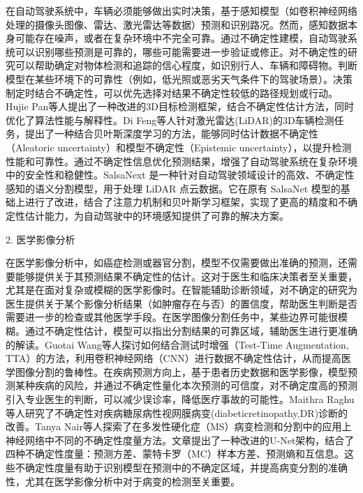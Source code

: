 在自动驾驶系统中，车辆必须能够做出实时决策，基于感知模型（如卷积神经网络处理的摄像头图像、雷达、激光雷达等数据）预测和识别路况。然而，感知数据本身可能存在噪声，或者在复杂环境中不完全可靠。通过不确定性建模，自动驾驶系统可以识别哪些预测是可靠的，哪些可能需要进一步验证或修正。对不确定性的研究可以帮助确定对物体检测和追踪的信心程度，如识别行人、车辆和障碍物。判断模型在某些环境下的可靠性（例如，低光照或恶劣天气条件下的驾驶场景）。决策制定时结合不确定性，可以优先选择对结果不确定性较低的路径规划或行动。Hujie Pan等人\cite{pan2020towards}提出了一种改进的3D目标检测框架，结合不确定性估计方法，同时优化了算法性能与解释性。Di Feng等人\cite{feng2018towards}针对激光雷达(LiDAR)的3D车辆检测任务，提出了一种结合贝叶斯深度学习的方法，能够同时估计数据不确定性（Aleatoric uncertainty）和模型不确定性（Epistemic uncertainty），以提升检测性能和可靠性。通过不确定性信息优化预测结果，增强了自动驾驶系统在复杂环境中的安全性和稳健性。SalsaNext\cite{cortinhal2020salsanext} 是一种针对自动驾驶领域设计的高效、不确定性感知的语义分割模型，用于处理 LiDAR 点云数据。它在原有 SalsaNet 模型的基础上进行了改进，结合了注意力机制和贝叶斯学习框架，实现了更高的精度和不确定性估计能力，为自动驾驶中的环境感知提供了可靠的解决方案。

2. 医学影像分析

在医学影像分析中，如癌症检测或器官分割，模型不仅需要做出准确的预测，还需要能够提供关于其预测结果不确定性的估计。这对于医生和临床决策者至关重要，尤其是在面对复杂或模糊的医学影像时。在智能辅助诊断领域，对不确定的研究为医生提供关于某个影像分析结果（如肿瘤存在与否）的置信度，帮助医生判断是否需要进一步的检查或其他医学手段。在医学图像分割任务中，某些边界可能很模糊。通过不确定性估计，模型可以指出分割结果的可靠区域，辅助医生进行更准确的解读。Guotai Wang等人\cite{wang2019aleatoric}探讨如何结合测试时增强（Test-Time Augmentation, TTA）的方法，利用卷积神经网络（CNN）进行数据不确定性估计，从而提高医学图像分割的鲁棒性。在疾病预测方向上，基于患者历史数据和医学影像，模型预测某种疾病的风险，并通过不确定性量化本次预测的可信度，对不确定度高的预测引入专业医生的判断，可以减少误诊率，降低医疗事故的可能性。Maithra Raghu等人\cite{raghu2019direct}研究了不确定性对疾病糖尿病性视网膜病变(diabeticretinopathy,DR)诊断的改善。Tanya Nair等人\cite{nair2020exploring}探索了在多发性硬化症（MS）病变检测和分割中的应用上神经网络中不同的不确定性度量方法。文章提出了一种改进的U-Net架构，结合了四种不确定性度量：预测方差、蒙特卡罗（MC）样本方差、预测熵和互信息。这些不确定性度量有助于识别模型在预测中的不确定区域，并提高病变分割的准确性，尤其在医学影像分析中对于病变的检测至关重要。



